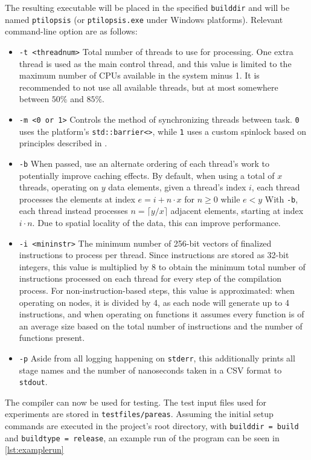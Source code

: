 \documentclass[12pt,dvipsnames]{article}
\newcommand{\icpp}[1]{\texttt{#1}}
\newcommand{\mono}[1]{\texttt{#1}}
\begin{document}
The resulting executable will be placed in the specified \mono{builddir} and will be named \mono{ptilopsis} (or \mono{ptilopsis.exe} under Windows platforms). Relevant command-line option are as follows:
\begin{itemize}
    \item \mono{-t <threadnum>} Total number of threads to use for processing.
        One extra thread is used as the main control thread, and this value is limited to the maximum number of CPUs available in the system minus 1. It is recommended to not use all available threads, but at most somewhere between $50\%$ and $85\%$.
    \item \mono{-m <0 or 1>} Controls the method of synchronizing threads between task. \mono{0} uses the platform's \icpp{std::barrier<>}, while \mono{1} uses a custom spinlock based on principles described in \cite{spinlock}.
    \item \mono{-b} When passed, use an alternate ordering of each thread's work to potentially improve caching effects.
    By default, when using a total of $x$ threads, operating on $y$ data elements, given a thread's index $i$, each thread processes the elements at index $e = i + n \cdot x$ for $n \geq 0$ while $e < y$
    With \mono{-b}, each thread instead processes $n = \lceil y / x \rceil$ adjacent elements, starting at index $i \cdot n$. Due to spatial locality of the data, this can improve performance.
    \item \mono{-i <mininstr>} The minimum number of 256-bit vectors of finalized instructions to process per thread. Since instructions are stored as 32-bit integers, this value is multiplied by 8 to obtain the minimum total number of instructions processed on each thread for every step of the compilation process. For non-instruction-based steps, this value is approximated: when operating on nodes, it is divided by 4, as each node will generate up to 4 instructions, and when operating on functions it assumes every function is of an average size based on the total number of instructions and the number of functions present.
    \item \mono{-p} Aside from all logging happening on \mono{stderr}, this additionally prints all stage names and the number of nanoseconds taken in a CSV format to \mono{stdout}.
\end{itemize}

The compiler can now be used for testing. The test input files used for experiments are stored in \mono{testfiles/pareas}. Assuming the initial setup commands are executed in the project's root directory, with  \mono{builddir = build} and \mono{buildtype = release}, an example run of the program can be seen in \autoref{lst:examplerun}
\end{document}
